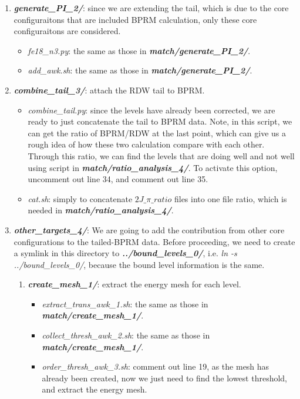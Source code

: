 \begin{enumerate}
\begin{enumerate}
			\item \textbf{\textit{generate\_PI\_2/}}: since we are extending the tail, which is due to the core configuraitons that are included BPRM calculation, only these core configuraitons are considered.
				\begin{itemize}
						\item \textit{fe18\_n3.py}: the same as those in \textbf{\textit{match/generate\_PI\_2/}}.		
						\item \textit{add\_awk.sh}: the same as those in \textbf{\textit{match/generate\_PI\_2/}}.
				\end{itemize}
			\item \textbf{\textit{combine\_tail\_3/}}: attach the RDW tail to BPRM.
				\begin{itemize}
					\item \textit{combine\_tail.py}: since the levels have already been corrected, we are ready to just concatenate the tail to BPRM data. Note, in this script, we can get the ratio of BPRM/RDW at the last point, which can give us a rough idea of how these two calculation compare with each other. Through this ratio, we can find the levels that are doing well and not well using script in \textbf{\textit{match/ratio\_analysis\_4/}}. To activate this option, uncomment out line 34, and comment out line 35.
					\item \textit{cat.sh}: simply to concatenate $2J\_\pi\_ratio$ files into one file ratio, which is needed in \textbf{\textit{match/ratio\_analysis\_4/}}.
				\end{itemize}
			\item \textbf{\textit{other\_targets\_4/}}: We are going to add the contribution from other core configurations to the tailed-BPRM data. Before proceeding, we need to create a symlink in this directory to \textbf{\textit{../bound\_levels\_0/}}, i.e. \colorbox{gray!20}{\textit{ln -s ../bound\_levels\_0/}}, because the bound level information is the same.
				\begin{enumerate}
					\item \textbf{\textit{create\_mesh\_1/}}: extract the energy mesh for each level.
						\begin{itemize}
							\item \textit{extract\_trans\_awk\_1.sh}: the same as those in \textbf{\textit{match/create\_mesh\_1/}}.
							\item \textit{collect\_thresh\_awk\_2.sh}: the same as those in \textbf{\textit{match/create\_mesh\_1/}}.		
							\item \textit{order\_thresh\_awk\_3.sh}: comment out line 19, as the mesh has already been created, now we just need to find the lowest threshold, and extract the energy mesh.

\end{itemize}
\end{enumerate}
\end{enumerate}
\end{enumerate}
